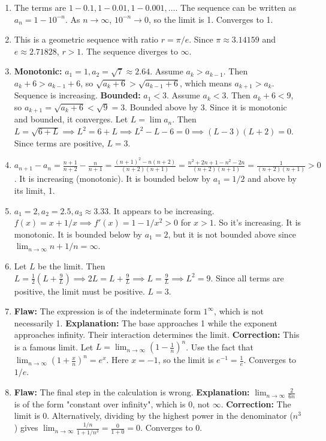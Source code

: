 \documentclass{article}
\begin{document}
\begin{enumerate}
    \item The terms are $1-0.1, 1-0.01, 1-0.001, \dots$. The sequence can be written as $a_n = 1 - 10^{-n}$. As $n \to \infty$, $10^{-n} \to 0$, so the limit is 1. Converges to 1.
    \item This is a geometric sequence with ratio $r = \pi/e$. Since $\pi \approx 3.14159$ and $e \approx 2.71828$, $r > 1$. The sequence diverges to $\infty$.
    \item \textbf{Monotonic:} $a_1=1, a_2=\sqrt{7}\approx 2.64$. Assume $a_k > a_{k-1}$. Then $a_k+6 > a_{k-1}+6$, so $\sqrt{a_k+6} > \sqrt{a_{k-1}+6}$, which means $a_{k+1} > a_k$. Sequence is increasing. \textbf{Bounded:} $a_1 < 3$. Assume $a_k < 3$. Then $a_k+6 < 9$, so $a_{k+1}=\sqrt{a_k+6} < \sqrt{9}=3$. Bounded above by 3. Since it is monotonic and bounded, it converges. Let $L = \lim a_n$. Then $L = \sqrt{6+L} \implies L^2 = 6+L \implies L^2-L-6=0 \implies (L-3)(L+2)=0$. Since terms are positive, $L=3$.
    \item $a_{n+1}-a_n = \frac{n+1}{n+2} - \frac{n}{n+1} = \frac{(n+1)^2 - n(n+2)}{(n+2)(n+1)} = \frac{n^2+2n+1 - n^2-2n}{(n+2)(n+1)} = \frac{1}{(n+2)(n+1)} > 0$. It is increasing (monotonic). It is bounded below by $a_1=1/2$ and above by its limit, 1.
    \item $a_1=2, a_2=2.5, a_3 \approx 3.33$. It appears to be increasing. $f(x)=x+1/x \implies f'(x)=1-1/x^2 > 0$ for $x>1$. So it's increasing. It is monotonic. It is bounded below by $a_1=2$, but it is not bounded above since $\lim_{n\to\infty} n+1/n = \infty$.
    \item Let $L$ be the limit. Then $L = \frac{1}{2}(L + \frac{9}{L}) \implies 2L = L + \frac{9}{L} \implies L = \frac{9}{L} \implies L^2 = 9$. Since all terms are positive, the limit must be positive. $L=3$.
    \item \textbf{Flaw:} The expression is of the indeterminate form $1^\infty$, which is not necessarily 1. \textbf{Explanation:} The base approaches 1 while the exponent approaches infinity. Their interaction determines the limit. \textbf{Correction:} This is a famous limit. Let $L = \lim_{n\to\infty} (1 - \frac{1}{n})^n$. Use the fact that $\lim_{n\to\infty} (1+\frac{x}{n})^n = e^x$. Here $x=-1$, so the limit is $e^{-1} = \frac{1}{e}$. Converges to $1/e$.
    \item \textbf{Flaw:} The final step in the calculation is wrong. \textbf{Explanation:} $\lim_{n\to\infty} \frac{2}{6n}$ is of the form "constant over infinity", which is 0, not $\infty$. \textbf{Correction:} The limit is 0. Alternatively, dividing by the highest power in the denominator ($n^3$) gives $\lim_{n\to\infty} \frac{1/n}{1 + 1/n^3} = \frac{0}{1+0} = 0$. Converges to 0.

\end{enumerate}
\end{document}
